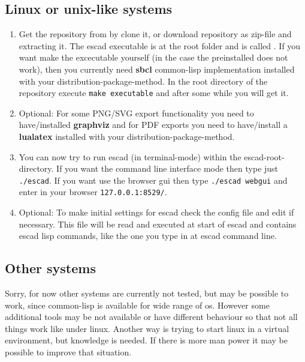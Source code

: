 \documentclass[a4paper, 12pt, openany]{scrbook}
\begin{document}
\subsection{Linux or unix-like systems}
\begin{enumerate}
\item Get the repository from  by clone it, or download repository as zip-file and extracting it. The escad executable is at the root folder and is called . If you want make the excecutable yourself (in the case the preinstalled does not work), then you currently need \textbf{sbcl} common-lisp implementation installed with your distribution-package-method. In the root directory of the repository execute \texttt{make executable} and after some while you will get it.
\item Optional: For some PNG/SVG export functionality you need to have/installed \textbf{graphviz} and for PDF exports you need to have/install a \textbf{lualatex} installed with your distribution-package-method.
\item You can now try to run escad (in terminal-mode) within the escad-root-directory. If you want the command line interface mode then type just \texttt{./escad}. If you want use the browser gui then type \texttt{./escad webgui} and enter in your browser \texttt{127.0.0.1:8529/}.
\item Optional: To make initial settings for escad check the config file  and edit if necessary. This file will be read and executed at start of escad and contains escad lisp commands, like the one you type in at escad command line.
\end{enumerate}
\subsection{Other systems}
Sorry, for now other systems are currently not tested, but may be possible to work, since common-lisp is available for wide range of os. However some additional tools may be not available or have different behaviour so that not all things work like under linux. Another way is trying to start linux in a virtual environment, but knowledge is needed. If there is more man power it may be possible to improve that situation.
\end{document}
